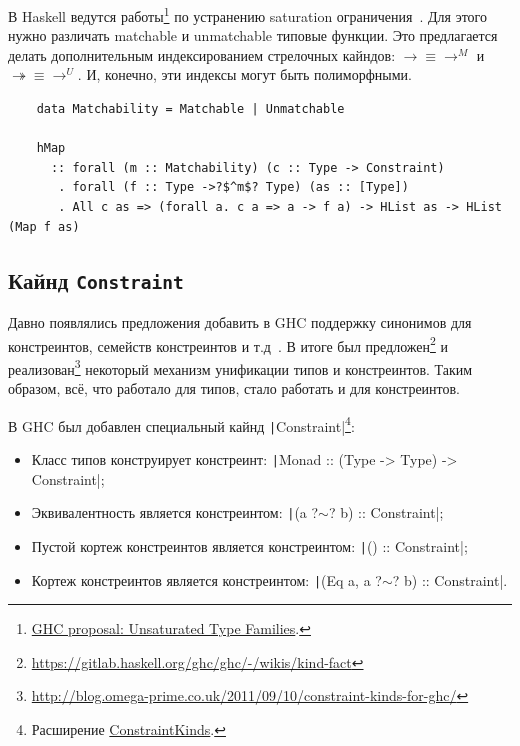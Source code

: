 В Haskell ведутся работы\footnote{\href{https://ghc-proposals.readthedocs.io/en/latest/proposals/0242-unsaturated-type-families.html}{GHC proposal: Unsaturated Type Families}.} по устранению saturation ограничения~\cite{kiss2019higher}.
Для этого нужно различать matchable и unmatchable типовые функции.
Это предлагается делать дополнительным индексированием стрелочных кайндов: $\to \equiv
\to^M$ и $\twoheadrightarrow \equiv \to^U$.
И, конечно, эти индексы могут быть полиморфными.

\begin{verbatim}
    data Matchability = Matchable | Unmatchable

    hMap
      :: forall (m :: Matchability) (c :: Type -> Constraint)
       . forall (f :: Type ->?$^m$? Type) (as :: [Type])
       . All c as => (forall a. c a => a -> f a) -> HList as -> HList (Map f as)
\end{verbatim}

\subsection{Кайнд \texttt{Constraint}}

Давно появлялись предложения добавить в GHC поддержку синонимов для констреинтов, семейств констреинтов и т.д~\cite{orchard2010haskell}.
В итоге был предложен\footnote{\url{https://gitlab.haskell.org/ghc/ghc/-/wikis/kind-fact}} и реализован\footnote{\url{http://blog.omega-prime.co.uk/2011/09/10/constraint-kinds-for-ghc/}} некоторый механизм унификации типов и констреинтов.
Таким образом, всё, что работало для типов, стало работать и для констреинтов.

В GHC был добавлен специальный кайнд \texttt|Constraint|\footnote{Расширение \href{https://downloads.haskell.org/ghc/9.2-latest/docs/html/users_guide/exts/constraint_kind.html}{ConstraintKinds}.}:
\begin{itemize}
    \item Класс типов конструирует констреинт: \texttt|Monad :: (Type -> Type) -> Constraint|;
    \item Эквивалентность является констреинтом: \texttt|(a ?$\sim$? b) :: Constraint|;
    \item Пустой кортеж констреинтов является констреинтом: \texttt|() :: Constraint|;
    \item Кортеж констреинтов является констреинтом: \texttt|(Eq a, a ?$\sim$? b) :: Constraint|.
\end{itemize}

